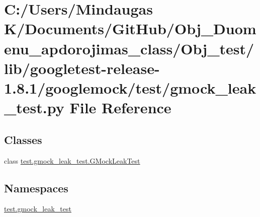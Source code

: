 \hypertarget{_obj__test_2lib_2googletest-release-1_88_81_2googlemock_2test_2gmock__leak__test_8py}{}\section{C\+:/\+Users/\+Mindaugas K/\+Documents/\+Git\+Hub/\+Obj\+\_\+\+Duomenu\+\_\+apdorojimas\+\_\+class/\+Obj\+\_\+test/lib/googletest-\/release-\/1.8.1/googlemock/test/gmock\+\_\+leak\+\_\+test.py File Reference}
\label{_obj__test_2lib_2googletest-release-1_88_81_2googlemock_2test_2gmock__leak__test_8py}
\subsection*{Classes}
\begin{DoxyCompactItemize}
\item 
class \mbox{\hyperlink{classtest_1_1gmock__leak__test_1_1_g_mock_leak_test}{test.\+gmock\+\_\+leak\+\_\+test.\+G\+Mock\+Leak\+Test}}
\end{DoxyCompactItemize}
\subsection*{Namespaces}
\begin{DoxyCompactItemize}
\item 
 \mbox{\hyperlink{namespacetest_1_1gmock__leak__test}{test.\+gmock\+\_\+leak\+\_\+test}}
\end{DoxyCompactItemize}
